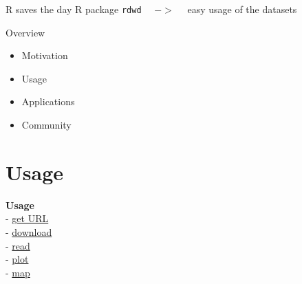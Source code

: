 \documentclass[compress, xcolor=dvipsnames]{beamer}\usepackage[]{graphicx}\usepackage[]{color}
\begin{document}

\begin{frame}{R saves the day}
R package \texttt{rdwd} ~~$->$~~ easy usage of the datasets
\end{frame}


\begin{frame}{Overview}
\begin{itemize}%
\item Motivation
\item Usage
\item Applications
\item Community
\end{itemize}
\end{frame}


\section{Usage}
\begin{frame}
\textbf{Usage}\\[1em]
- \hyperlink{ul}{get URL}\\
- \hyperlink{ud}{download}\\
- \hyperlink{ur}{read}\\
- \hyperlink{up}{plot}\\
- \hyperlink{um}{map}
\end{frame}

\end{document}
